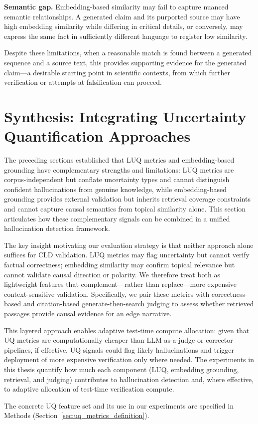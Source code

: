 \noindent\textbf{Semantic gap.} Embedding-based similarity may fail to capture nuanced semantic relationships. A generated claim and its purported source may have high embedding similarity while differing in critical details, or conversely, may express the same fact in sufficiently different language to register low similarity.

\noindent Despite these limitations, when a reasonable match is found between a generated sequence and a source text, this provides supporting evidence for the generated claim---a desirable starting point in scientific contexts, from which further verification or attempts at falsification can proceed.

\section{Synthesis: Integrating Uncertainty Quantification Approaches}
\label{sec:uq_design_rationale}

The preceding sections established that LUQ metrics and embedding-based grounding have complementary strengths and limitations: LUQ metrics are corpus-independent but conflate uncertainty types and cannot distinguish confident hallucinations from genuine knowledge, while embedding-based grounding provides external validation but inherits retrieval coverage constraints and cannot capture causal semantics from topical similarity alone. This section articulates how these complementary signals can be combined in a unified hallucination detection framework.

The key insight motivating our evaluation strategy is that neither approach alone suffices for CLD validation. LUQ metrics may flag uncertainty but cannot verify factual correctness; embedding similarity may confirm topical relevance but cannot validate causal direction or polarity. We therefore treat both as lightweight features that complement---rather than replace---more expensive context-sensitive validation. Specifically, we pair these metrics with correctness-based and citation-based generate-then-search judging to assess whether retrieved passages provide causal evidence for an edge narrative.

This layered approach enables adaptive test-time compute allocation: given that UQ metrics are computationally cheaper than LLM-as-a-judge or corrector pipelines, if effective, UQ signals could flag likely hallucinations and trigger deployment of more expensive verification only where needed. The experiments in this thesis quantify how much each component (LUQ, embedding grounding, retrieval, and judging) contributes to hallucination detection and, where effective, to adaptive allocation of test-time verification compute.

\noindent The concrete UQ feature set and its use in our experiments are specified in Methods (Section~\ref{sec:uq_metrics_definition}).
